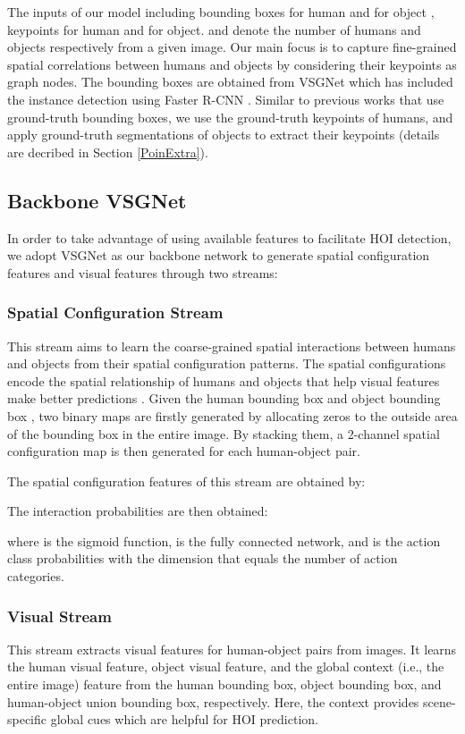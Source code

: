 \documentclass[a4paper, 10pt, conference]{IEEEtran}
\begin{document}
The inputs of our model including bounding boxes  for human  and  for object , keypoints  for human and  for object.  and  denote the number of humans and objects respectively from a given image. Our main focus is to capture fine-grained spatial correlations between humans and objects by considering their keypoints as graph nodes. The bounding boxes are obtained from VSGNet \cite{VSGNet} which has included the instance detection using Faster R-CNN \cite{Faster-R-CNN}. Similar to previous works \cite{iCAN, TIN} that use ground-truth bounding boxes, we use the ground-truth keypoints of humans, and apply ground-truth segmentations of objects to extract their keypoints (details are decribed in Section \ref{PoinExtra}).



\subsection{Backbone VSGNet}
\label{vsgnet}
In order to take advantage of using available features to facilitate HOI detection, we adopt VSGNet \cite{VSGNet} as our backbone network to generate spatial configuration features and visual features through two streams:

\subsubsection{Spatial Configuration Stream}
\label{SpatialConfigurationStream}
This stream aims to learn the coarse-grained spatial interactions between humans and objects from their spatial configuration patterns. The spatial configurations encode the spatial relationship of humans and objects that help visual features make better predictions \cite{VSGNet,iCAN}. Given the human bounding box  and object bounding box , two binary maps are firstly generated by allocating zeros to the outside area of the bounding box in the entire image. By stacking them, a 2-channel spatial configuration map  is then generated for each human-object pair. 

The spatial configuration features  of this stream are obtained by:


The interaction probabilities are then obtained:

where  is the sigmoid function,  is the fully connected network, and  is the action class probabilities with the dimension that equals the number of action categories.

\subsubsection{Visual Stream}
\label{VisualStream}
This stream extracts visual features for human-object pairs from images. It learns the human visual feature, object visual feature, and the global context (i.e., the entire image) feature from the human bounding box, object bounding box, and human-object union bounding box, respectively. Here, the context provides scene-specific global cues which are helpful for HOI prediction. 
\end{document}
